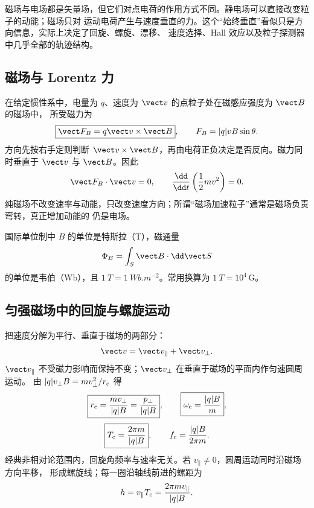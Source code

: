 磁场与电场都是矢量场，但它们对点电荷的作用方式不同。静电场可以直接改变粒子的动能；磁场只对
运动电荷产生与速度垂直的力。这个“始终垂直”看似只是方向信息，实际上决定了回旋、螺旋、漂移、
速度选择、Hall 效应以及粒子探测器中几乎全部的轨迹结构。

\subsection*{磁场与 Lorentz 力}

在给定惯性系中，电量为 $q$、速度为 $\vect v$ 的点粒子处在磁感应强度为 $\vect B$ 的磁场中，
所受磁力为
\begin{equation}
  \boxed{\vect F_B=q\vect v\times\vect B},
  \qquad F_B=|q|vB\sin\theta .
\end{equation}
方向先按右手定则判断 $\vect v\times\vect B$，再由电荷正负决定是否反向。磁力同时垂直于
$\vect v$ 与 $\vect B$。因此
\begin{equation}
  \vect F_B\cdot\vect v=0,
  \qquad \frac{\dd}{\dd t}\left(\frac12mv^2\right)=0.
\end{equation}
纯磁场不改变速率与动能，只改变速度方向；所谓“磁场加速粒子”通常是磁场负责弯转，真正增加动能的
仍是电场。

\lorentzDirectionDiagram

国际单位制中 $B$ 的单位是特斯拉（T），磁通量
\begin{equation}
  \Phi_B=\int_S\vect B\cdot\dd\vect S
\end{equation}
的单位是韦伯（Wb），且 $\SI{1}{T}=\SI{1}{Wb.m^{-2}}$。常用换算为
$\SI{1}{T}=10^4\,\mathrm G$。

\subsection*{匀强磁场中的回旋与螺旋运动}

把速度分解为平行、垂直于磁场的两部分：
\begin{equation}
  \vect v=\vect v_\parallel+\vect v_\perp .
\end{equation}
$\vect v_\parallel$ 不受磁力影响而保持不变；$\vect v_\perp$ 在垂直于磁场的平面内作匀速圆周运动。
由 $|q|v_\perp B=mv_\perp^2/r_{\rm c}$ 得
\begin{equation}
  \boxed{r_{\rm c}=\frac{mv_\perp}{|q|B}=\frac{p_\perp}{|q|B}},
  \qquad
  \boxed{\omega_{\rm c}=\frac{|q|B}{m}},
\end{equation}
\begin{equation}
  \boxed{T_{\rm c}=\frac{2\pi m}{|q|B}},
  \qquad
  f_{\rm c}=\frac{|q|B}{2\pi m}.
\end{equation}
经典非相对论范围内，回旋角频率与速率无关。若 $v_\parallel\ne0$，圆周运动同时沿磁场方向平移，
形成螺旋线；每一圈沿轴线前进的螺距为
\begin{equation}
  h=v_\parallel T_{\rm c}=\frac{2\pi m v_\parallel}{|q|B}.
\end{equation}

